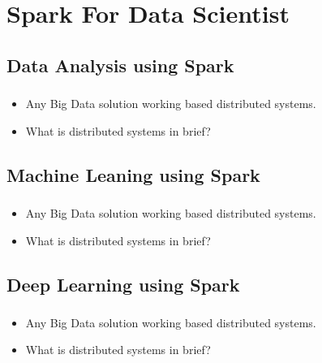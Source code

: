 
\section{Spark For Data Scientist}



\subsection{Data Analysis using Spark}

\begin{frame}
  \frametitle{\subsecname}
	\begin{itemize}[<+->]
		\item Any Big Data solution working based distributed systems.
		\item What is distributed systems in brief?
	\end{itemize}
\end{frame}

\subsection{Machine Leaning using Spark }

\begin{frame}
  \frametitle{\subsecname}
	\begin{itemize}[<+->]
		\item Any Big Data solution working based distributed systems.
		\item What is distributed systems in brief?
	\end{itemize}
\end{frame}


\subsection{Deep Learning using Spark}

\begin{frame}
  \frametitle{\subsecname}
	\begin{itemize}[<+->]
		\item Any Big Data solution working based distributed systems.
		\item What is distributed systems in brief?
	\end{itemize}
\end{frame}

